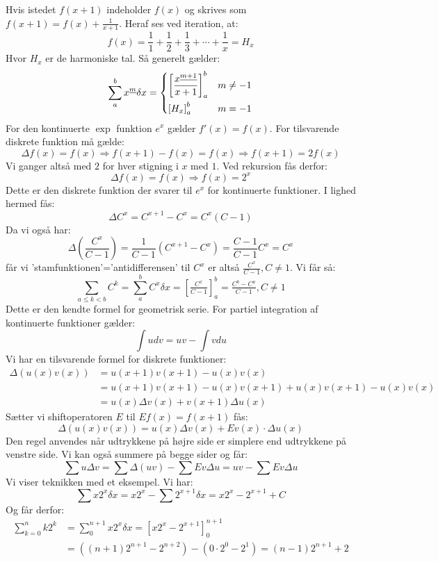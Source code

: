 Hvis istedet \(f(x+1)\) indeholder \(f(x)\) og skrives som \(f(x+1)=f(x)+\frac{1}{x+1}\). Heraf ses ved iteration, at:
\[f(x)=\frac{1}{1}+\frac{1}{2}+\frac{1}{3}+ \dotsm +\frac{1}{x}=H_{x}\]
Hvor \(H_{x}\) er de harmoniske tal. Så generelt gælder:
\begin{equation*}
\sum_{a}^{b}x^{\underline{m}}\delta x=
\begin{dcases}
\left[\frac{x^{\underline{m+1}}}{x+1}\right]_{a}^{b} &m \neq -1\\
\left[H_{x}\right]_{a}^{b} &m=-1
\end{dcases}
\end{equation*}
For den kontinuerte \(\exp\) funktion \(e^{x}\) gælder \(f'(x)=f(x)\). For tilsvarende diskrete funktion må gælde:
\[\Delta f(x)=f(x) \Rightarrow f(x+1)-f(x)=f(x) \Rightarrow f(x+1)=2f(x)\]
Vi ganger altså med \(2\) for hver stigning i \(x\) med \(1\). Ved rekursion fås derfor:
\[\Delta f(x) =f(x) \Rightarrow f(x)=2^{x}\]
Dette er den diskrete funktion der svarer til \(e^{x}\) for kontinuerte funktioner. I lighed hermed fås:
\[\Delta C^{x}=C^{x+1}-C^{x}=C^{x}(C-1)\] 
Da vi også har:
\[\Delta(\frac{C^{x}}{C-1})=\frac{1}{C-1}(C^{x+1}-C^{x})=\frac{C-1}{C-1}C^{x}=C^{x}\]
får vi 'stamfunktionen'='antidifferensen' til \(C^{x}\) er altså \(\tfrac{C^{x}}{C-1}, C \neq 1\). Vi får så:
\[\sum_{a \leq k < b}C^{k}=\sum_{a}^{b}C^{x} \delta x= [\tfrac{C^{x}}{C-1}]_{a}^{b}=\tfrac{C^{b}-C^{a}}{C-1}, C \neq 1\]
Dette er den kendte formel for geometrisk serie.
For partiel integration af kontinuerte funktioner gælder:
\[\int u dv=uv-\int v du\]
Vi har en tilsvarende formel for diskrete funktioner:
\begin{align*}
\Delta (u(x)v(x))&=u(x+1)v(x+1)-u(x)v(x)\\
&=u(x+1)v(x+1)-u(x)v(x+1)+u(x)v(x+1)-u(x)v(x)\\
&=u(x)\Delta v(x)+v(x+1)\Delta u(x)
\end{align*}
Sætter vi shiftoperatoren \(E\) til \(Ef(x)=f(x+1)\) fås:
\[\Delta(u(x)v(x))=u(x)\Delta v(x)+Ev(x) \cdot \Delta u(x)\]
Den regel anvendes når udtrykkene på højre side er simplere end udtrykkene på venstre side. Vi kan også summere på begge sider og får:
\[\sum u \Delta v =\sum \Delta (uv) -\sum Ev \Delta u=uv-\sum Ev\Delta u\]
Vi viser teknikken med et eksempel. Vi har:
\[\sum x2^{x} \delta x=x2^{x}-\sum 2^{x+1} \delta x=x2^{x}-2^{x+1}+C\]
Og får derfor:
\begin{align*}
\sum_{k=0}^{n}k2^{k}&=\sum_{0}^{n+1}x2^{x}\delta x =[x2^{x}-2^{x+1}]_{0}^{n+1}\\
&=((n+1)2^{n+1}-2^{n+2})-(0 \cdot 2^{0}-2^{1})=(n-1)2^{n+1}+2
\end{align*}

